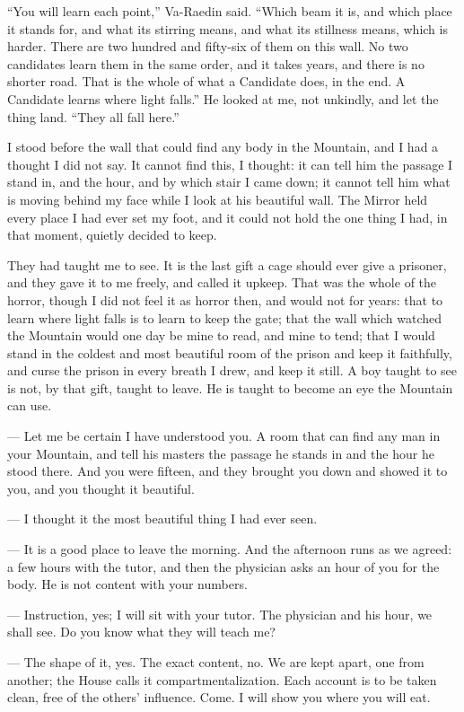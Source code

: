 ``You will learn each point,'' Va-Raedin said. 
``Which beam it is, and which place it stands for, and what its stirring means, and what its stillness means, which is harder. 
There are two hundred and fifty-six of them on this wall. 
No two candidates learn them in the same order, and it takes years, and there is no shorter road. 
That is the whole of what a Candidate does, in the end. 
A Candidate learns where light falls.'' 
He looked at me, not unkindly, and let the thing land. 
``They all fall here.''\par

I stood before the wall that could find any body in the Mountain, and I had a thought I did not say. It cannot find this, I thought: it can tell him the passage I stand in, and the hour, and by which stair I came down; it cannot tell him what is moving behind my face while I look at his beautiful wall. The Mirror held every place I had ever set my foot, and it could not hold the one thing I had, in that moment, quietly decided to keep.\par

They had taught me to see.
It is the last gift a cage should ever give a prisoner, and they gave it to me freely, and called it upkeep. 
That was the whole of the horror, though I did not feel it as horror then, and would not for years: that to learn where light falls is to learn to keep the gate; 
that the wall which watched the Mountain would one day be mine to read, and mine to tend; 
that I would stand in the coldest and most beautiful room of the prison and keep it faithfully, and curse the prison in every breath I drew, and keep it still. 
A boy taught to see is not, by that gift, taught to leave. 
He is taught to become an eye the Mountain can use.\par

\begin{room}

--- Let me be certain I have understood you. A room that can find any man in your Mountain, and tell his masters the passage he stands in and the hour he stood there. And you were fifteen, and they brought you down and showed it to you, and you thought it beautiful.

--- I thought it the most beautiful thing I had ever seen. 

--- It is a good place to leave the morning. And the afternoon runs as we agreed: a few hours with the tutor, and then the physician asks an hour of you for the body. He is not content with your numbers.

--- Instruction, yes; I will sit with your tutor. The physician and his hour, we shall see. Do you know what they will teach me?

--- The shape of it, yes. The exact content, no. We are kept apart, one from another; the House calls it compartmentalization. Each account is to be taken clean, free of the others' influence. Come. I will show you where you will eat.

\end{room}
